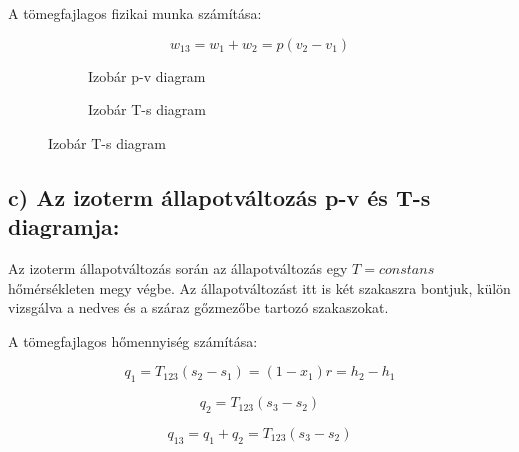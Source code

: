 A tömegfajlagos fizikai munka számítása:

\begin{equation*}
w_{13} = w_1+w_2 = p(v_2-v_1)
\end{equation*}

\begin{figure}[h]
	\centering
	\begin{subfigure}[b]{0.545\textwidth} 
		\centering
		\begin{tikzpicture}
		
		
		
		\end{tikzpicture}
		\caption{Izobár p-v diagram}
		
	\end{subfigure}
	\begin{subfigure}[b]{0.435\textwidth}
		\centering
		\begin{tikzpicture}
		
		
		
		\end{tikzpicture}
		\caption{Izobár T-s diagram}
		
	\end{subfigure}
\end{figure}

\pagebreak

\subsection*{c) Az izoterm állapotváltozás p-v és T-s diagramja:}

Az izoterm állapotváltozás során az állapotváltozás egy $T=constans$ hőmérsékleten megy végbe. Az állapotváltozást itt is két szakaszra bontjuk, külön vizsgálva a nedves és a száraz gőzmezőbe tartozó szakaszokat.

A tömegfajlagos hőmennyiség számítása:

\begin{equation*}
q_1 = T_{123} (s_2-s_1) = (1-x_1)r = h_2-h_1
\end{equation*}

\begin{equation*}
q_2 = T_{123}(s_3-s_2)
\end{equation*}

\begin{equation*}
q_{13} = q_1+q_2 = T_{123}(s_3-s_2)
\end{equation*}

